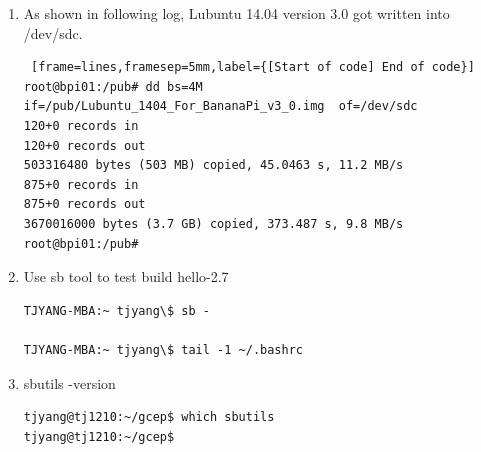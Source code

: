 \begin{enumerate}
\item As shown in following log, Lubuntu 14.04 version 3.0 got written into /dev/sdc.
\begin{Verbatim} [frame=lines,framesep=5mm,label={[Start of code] End of code}]
root@bpi01:/pub# dd bs=4M if=/pub/Lubuntu_1404_For_BananaPi_v3_0.img  of=/dev/sdc
120+0 records in
120+0 records out
503316480 bytes (503 MB) copied, 45.0463 s, 11.2 MB/s
875+0 records in
875+0 records out
3670016000 bytes (3.7 GB) copied, 373.487 s, 9.8 MB/s
root@bpi01:/pub# 
\end{Verbatim}

\item Use sb tool to test build hello-2.7
  \begin{lstlisting}
TJYANG-MBA:~ tjyang\$ sb -

TJYANG-MBA:~ tjyang\$ tail -1 ~/.bashrc

  \end{lstlisting}

\item sbutils -version
  \begin{lstlisting}
tjyang@tj1210:~/gcep$ which sbutils
tjyang@tj1210:~/gcep$ 
  \end{lstlisting}
\end{enumerate}

